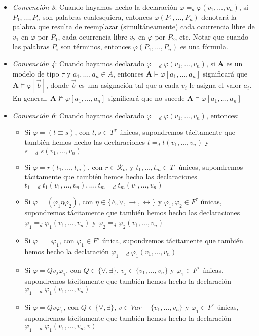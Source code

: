 \documentclass{article}
\begin{document}
\begin{itemize}
  \item \textit{Convención 3}: Cuando hayamos hecho la declaración $\varphi=_d\varphi(v_1,\dots,v_n)$, si $P_1,\dots,P_n$ son palabras cualesquiera, entonces $\varphi(P_1,\dots,P_n)$ denotará la palabra que resulta de reemplazar (simultáneamente) cada ocurrencia libre de $v_1$ en $\varphi$ por $P_1$, cada ocurrencia libre $v_2$ en $\varphi$ por $P_2$, etc.
        \newline
        Notar que cuando las palabras $P_i$ son términos, entonces $\varphi(P_1,\dots,P_n)$ es una fórmula.
  \item \textit{Convención 4}: Cuando hayamos declarado $\varphi=_d\varphi(v_1,\dots,v_n)$, si $\mathbf{A}$ es un modelo de tipo $\tau$ y $a_1,\dots,a_n\in A$, entonces $\mathbf{A}\vDash\varphi[a_1,\dots,a_n]$ significará que $\mathbf{A}\vDash\varphi[\vec{b}]$, donde $\vec{b}$ es una asignación tal que a cada $v_i$ le asigna el valor $a_i$.
        \newline
        En general, $\mathbf{A}\nvDash\varphi[a_1,\dots,a_n]$ significará que no sucede $\mathbf{A}\vDash\varphi[a_1,\dots,a_n]$
  \item \textit{Convención 6}: Cuando hayamos declarado $\varphi=_d\varphi(v_1,\dots,v_n)$, entonces:
        \begin{itemize}
          \item Si $\varphi=(t\equiv s)$, con $t,s\in T^\tau$ únicos, supondremos tácitamente que también hemos hecho las declaraciones $t=_d t(v_1,\dots,v_n)$ y $s=_d s(v_1,\dots,v_n)$
          \item Si $\varphi=r(t_1,\dots,t_m)$, con $r\in\mathcal{R}_m$ y $t_1,\dots,t_m\in T^\tau$ únicos, supondremos tácitamente que también hemos hecho las declaraciones $t_1=_d t_1(v_1,\dots,v_n),\dots,t_m=_d t_m(v_1,\dots,v_n)$
          \item Si $\varphi=(\varphi_1\eta\varphi_2)$, con $\eta\in\{\land,\lor,\to,\leftrightarrow\}$ y $\varphi_1,\varphi_2\in F^\tau$ únicas, supondremos tácitamente que también hemos hecho las declaraciones $\varphi_1=_d\varphi_1(v_1,\dots,v_n)$ y $\varphi_2=_d\varphi_2(v_1,\dots,v_n)$
          \item Si $\varphi=\neg\varphi_1$, con $\varphi_1\in F^\tau$ única, supondremos tácitamente que también hemos hecho la declaración $\varphi_1=_d\varphi_1(v_1,\dots,v_n)$
          \item Si $\varphi=Qv_j\varphi_1$, con $Q\in\{\forall,\exists\}$, $v_j\in\{v_1,\dots,v_n\}$ y $\varphi_1\in F^\tau$ únicas, supondremos tácitamente que también hemos hecho la declaración $\varphi_1=_d\varphi_1(v_1,\dots,v_n)$
          \item Si $\varphi=Qv\varphi_1$, con $Q\in\{\forall,\exists\}$, $v\in Var-\{v_1,\dots,v_n\}$ y $\varphi_1\in F^\tau$ únicas, supondremos tácitamente que también hemos hecho la declaración $\varphi_1=_d\varphi_1(v_1,\dots,v_n,v)$
        \end{itemize}
\end{itemize}
\end{document}
